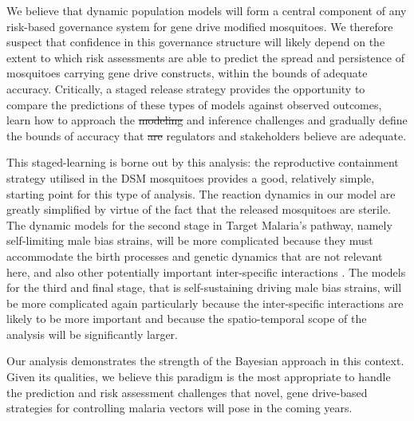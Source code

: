 \documentclass[]{bmcart}
\providecommand{\DIFaddtex}[1]{{\protect\color{blue}\uwave{#1}}} %
\providecommand{\DIFdeltex}[1]{{\protect\color{red}\sout{#1}}}                      %
\providecommand{\DIFaddbegin}{} %
\providecommand{\DIFaddend}{} %
\providecommand{\DIFdelbegin}{} %
\providecommand{\DIFdelend}{} %
\providecommand{\DIFadd}[1]{\texorpdfstring{\DIFaddtex{#1}}{#1}} %
\providecommand{\DIFdel}[1]{\texorpdfstring{\DIFdeltex{#1}}{}} %
\newcommand{\DIFscaledelfig}{0.5}
\newlength{\DIFdelgraphicswidth} %
\newlength{\DIFdelgraphicsheight} %
\newcommand{\DIFaddincludegraphics}[2][]{{\color{blue}\fbox{\DIFOincludegraphics[#1]{#2}}}} %
\newcommand{\DIFdelincludegraphics}[2][]{%
\sbox{\DIFdelgraphicsbox}{\DIFOincludegraphics[#1]{#2}}%
\settoboxwidth{\DIFdelgraphicswidth}{\DIFdelgraphicsbox} %
\settoboxtotalheight{\DIFdelgraphicsheight}{\DIFdelgraphicsbox} %
\scalebox{\DIFscaledelfig}{%
\parbox[b]{\DIFdelgraphicswidth}{\usebox{\DIFdelgraphicsbox}\\[-\baselineskip] \rule{\DIFdelgraphicswidth}{0em}}\llap{\resizebox{\DIFdelgraphicswidth}{\DIFdelgraphicsheight}{%
\setlength{\unitlength}{\DIFdelgraphicswidth}%
\begin{picture}(1,1)%
\thicklines\linethickness{2pt} %
{\color[rgb]{1,0,0}\put(0,0){\framebox(1,1){}}}%
{\color[rgb]{1,0,0}\put(0,0){\line( 1,1){1}}}%
{\color[rgb]{1,0,0}\put(0,1){\line(1,-1){1}}}%
\end{picture}%
}\hspace*{3pt}}} %
} %
\DeclareRobustCommand{\DIFaddbegin}{\DIFOaddbegin \let\includegraphics\DIFaddincludegraphics} %
\DeclareRobustCommand{\DIFaddend}{\DIFOaddend \let\includegraphics\DIFOincludegraphics} %
\DeclareRobustCommand{\DIFdelbegin}{\DIFOdelbegin \let\includegraphics\DIFdelincludegraphics} %
\DeclareRobustCommand{\DIFdelend}{\DIFOaddend \let\includegraphics\DIFOincludegraphics} %
\begin{document}
We believe that dynamic population models will form a central component of any risk-based governance system for gene drive modified mosquitoes. We therefore suspect that confidence in this governance structure will likely depend on the extent to which risk assessments are able to predict the spread and persistence of mosquitoes carrying gene drive constructs, within the bounds of adequate accuracy. Critically, a staged release strategy provides the opportunity to compare the predictions of these types of models against observed outcomes, learn how to approach the \DIFdelbegin \DIFdel{modeling }\DIFdelend \DIFaddbegin \DIFadd{modelling }\DIFaddend and inference challenges and gradually define the bounds of accuracy that \DIFdelbegin \DIFdel{are }\DIFdelend regulators and stakeholders believe are adequate.

This staged-learning is borne out by this analysis: the reproductive containment strategy utilised in the DSM mosquitoes provides a good, relatively simple, starting point for this type of analysis. The reaction dynamics in our model are greatly simplified by virtue of the fact that the released \DIFaddbegin \DIFadd{make }\DIFaddend mosquitoes are sterile. The dynamic models for the second stage in Target Malaria's pathway, namely self-limiting male bias strains, will be more complicated because they must accommodate the birth processes and genetic dynamics that are not relevant here, and also other potentially important inter-specific interactions \citep{Beeton2020}. The models for the third and final stage, that is self-sustaining driving male bias strains, will be more complicated again particularly because the inter-specific interactions are likely to be more important and because the spatio-temporal scope of the analysis will be significantly larger.

Our analysis demonstrates the strength of the Bayesian approach in this context. Given its qualities, we believe this paradigm is the most appropriate to handle the prediction and risk assessment challenges that novel, gene drive-based strategies for controlling malaria vectors will pose in the coming years.

\end{document}
